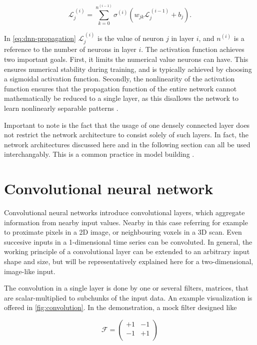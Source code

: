 \begin{equation}
\label{eq:dnn-propagation}
\mathcal{L}_j^{\,(i)} = \sum\limits_{k = 0}^{n^{(i-1)}} \sigma^{(i)}\left( w_{jk} \mathcal{L}_j^{\,(i-1)} + b_j\right).
\end{equation}

In \autoref{eq:dnn-propagation} $\mathcal{L}_j^{\,(i)}$ is the value of neuron $j$ in layer $i$, and $n^{(i)}$ is a reference to the number of neurons in 
layer $i$. The activation function achieves two important goals. First, it limits the numerical value neurons can have. This ensures numerical stability
during training, and is typically achieved by choosing a sigmoidal activation function. Secondly, the nonlinearity of the activation function ensures that 
the propagation function of the entire network cannot mathematically be reduced to a single layer, as this disallows the network to learn nonlinearly 
separable patterns \cite{russell2010artificial}. 

Important to note is the fact that the usage of one densely connected layer does not restrict the network architecture to consist solely of such layers. 
In fact, the network architectures discussed here and in the following section can all be used interchangably. This is a common practice in model building
\cite{szegedy2015going, krizhevsky2017imagenet}.


\section{Convolutional neural network}
\label{sec:CNN}

Convolutional neural networks introduce convolutional layers, which aggregate information from nearby input values. Nearby in this case referring for example 
to proximate pixels in a 2D image, or neighbouring voxels in a 3D scan. Even succesive inputs in a 1-dimensional time series can be convoluted. In general, 
the working principle of a convolutional layer can be extended to an arbitrary input shape and size, but will be representatively explained here for a 
two-dimensional, image-like input.

The convolution in a single layer is done by one or several filters, matrices, that are scalar-multiplied to subchunks of the input data. An example 
visualization is offered in \autoref{fig:convolution}. In the demonstration, a mock filter designed like

\begin{equation*}
\mathcal{F} = 
\begin{pmatrix}
+1 & -1 \\
-1 & +1 \\
\end{pmatrix}
\end{equation*}

